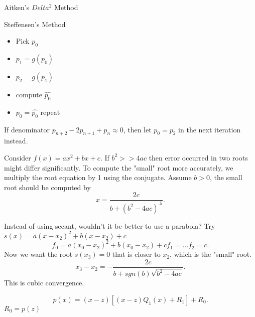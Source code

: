 \documentclass[class=article, crop=false]{standalone}
\theoremstyle{plain}
\theoremstyle{remark}
\begin{document}
Aitken's $Delta^2$ Method

Steffensen's Method
\begin{itemize}
	\item Pick $p_0$
	\item $p_1= g(p_0)$
	\item $p_2=g(p_1)$
	\item compute $\hat{p_0}$ 
	\item $p_0=\hat{p_0}$ 
	repeat
\end{itemize}

If denominator $p_{n+2}-2p_{n+1}+p_n \approx 0$, then let $p_0=p_2$ in the next iteration instead.

Consider $f(x)=ax^2+bx+c$. If $b^2 >> 4ac$ then error occurred in two roots might differ significantly. To compute the "small" root more accurately, we multiply the root equation by 1 using the conjugate.
Assume $b>0$, the small root should be computed by
\[
	x=\frac{2c}{b+(b^2-4ac)^{ .5}}
.\] 

Instead of using secant, wouldn't it be better to use a parabola?
Try $s(x)=a(x-x_2)^2+b(x-x_2)+c  $ 
\[
	f_0=a(x_0-x_2)^2+b(x_0-x_2)+c
	f_1=\ldots
	f_2=c
.\] 
Now we want the root $s(x_3)=0 $ that is closer to $x_2$, which is the "small" root.
\[
	x_3-x_2=-\frac{2c}{b+sgn(b)\sqrt{b^2-4ac}}
.\] 
This is cubic convergence.

\[
	p(x)=(x-z)[( x-z)Q_1(x)+R_1 ]+R_0 
.\] 
$R_0=p(z) $
\end{document}
